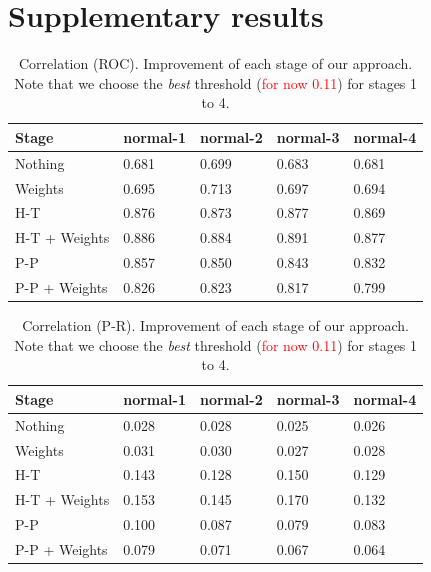 \documentclass[wcp]{jmlr}
\begin{document}
\newpage
\clearpage



\newpage
\clearpage

\appendix

\section{Supplementary results}

\begin{table}[htbp]
\centering
\caption{Correlation (ROC). Improvement of each stage of our approach. Note that we choose the
         \textit{best} threshold (\textcolor{red}{for now 0.11}) for stages 1 to 4.}
\begin{tabular}{*{5}{l}}
\toprule
Stage               & normal-1 & normal-2 & normal-3 & normal-4 \\
\midrule
Nothing             & 0.681 & 0.699 & 0.683 & 0.681\\
Weights             & 0.695 & 0.713 & 0.697 & 0.694\\
H-T                 & 0.876 & 0.873 & 0.877 & 0.869\\
H-T + Weights       & 0.886 & 0.884 & 0.891 & 0.877\\
P-P                 & 0.857 & 0.850 & 0.843 & 0.832\\
P-P + Weights       & 0.826 & 0.823 & 0.817 & 0.799\\
\bottomrule
\end{tabular}
\end{table}

\begin{table}[htbp]
\centering
\caption{Correlation (P-R). Improvement of each stage of our approach. Note that we choose the
         \textit{best} threshold (\textcolor{red}{for now 0.11}) for stages 1 to 4.}
\begin{tabular}{*{5}{l}}
\toprule
Stage               & normal-1 & normal-2 & normal-3 & normal-4 \\
\midrule
Nothing             & 0.028 & 0.028 & 0.025 & 0.026\\
Weights             & 0.031 & 0.030 & 0.027 & 0.028\\
H-T                 & 0.143 & 0.128 & 0.150 & 0.129\\
H-T + Weights       & 0.153 & 0.145 & 0.170 & 0.132\\
P-P                 & 0.100 & 0.087 & 0.079 & 0.083\\
P-P + Weights       & 0.079 & 0.071 & 0.067 & 0.064\\
\bottomrule
\end{tabular}
\end{table}
\end{document}
